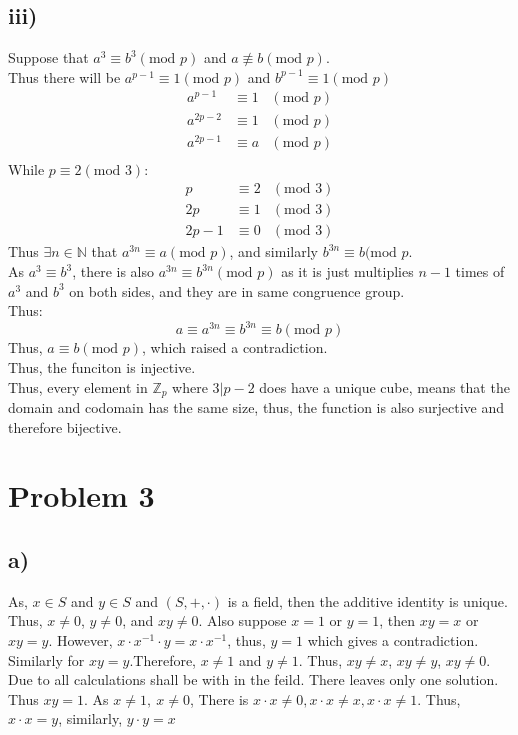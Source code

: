 \documentclass{article}
\begin{document}
\subsection*{iii)}
Suppose that \(a^3\equiv b^3 (\text{mod }p)\) and \(a\not\equiv b (\text{mod }p)\).\\
Thus there will be \(a^{p-1}\equiv 1 (\text{mod }p )\) and \(b^{p-1}\equiv 1(\text{mod }p)\)
\begin{align*}
    a^{p-1}&\equiv 1 &(\text{mod }p)\\
    a^{2p-2}&\equiv 1 &(\text{mod }p)\\
    a^{2p-1}&\equiv a &(\text{mod }p)\\
\end{align*}
While \(p\equiv 2 (\text{mod }3)\):
\begin{align*}
    p&\equiv 2 &(\text{mod }3)\\
    2p&\equiv 1 &(\text{mod }3)\\
    2p-1&\equiv 0 &(\text{mod }3)
\end{align*}
Thus \(\exists n\in \mathbb{N}\) that \(a^{3n} \equiv a (\text{mod }p)\), and similarly \(b^{3n} \equiv b (\text{mod }p\).\\
As \(a^3\equiv b^3\), there is also \(a^{3n}\equiv b^{3n} (\text{mod }p)\) as it is just multiplies \(n-1\) times of \(a^3\) and \(b^3\) on both sides, and they are in same congruence group.
\\ Thus:
\[a \equiv a^{3n} \equiv b^{3n} \equiv b (\text{mod }p)\]
Thus, \(a\equiv b (\text{mod }p)\), which raised a contradiction. \\
Thus, the funciton is injective.\\
Thus, every element in \(\mathbb{Z}_p\) where \(3|p-2\) does have a unique cube, means that the domain and codomain has the same size, thus, the function is also surjective and therefore bijective. 
\newpage
\section*{Problem 3}
\subsection*{a)}
As, \(x\in S\) and \(y \in S\) and \((S,+,\cdot)\) is a field, then the additive identity is unique.
Thus, \(x\neq 0\), \(y\neq 0\), and \(xy\neq 0\). Also suppose \(x=1\) or \(y=1\), then \(xy=x\) or \(xy=y\).
However, \(x\cdot x^{-1}\cdot y = x\cdot x^{-1}\), thus, \(y=1\) which gives a contradiction. Similarly for \(xy=y\).Therefore, \(x\neq1\) and \(y\neq 1\).
Thus, \(xy\neq x\), \(xy\neq y\), \(xy\neq 0\). Due to all calculations shall be with in the feild. There leaves only one solution. Thus
\(xy = 1\). As \(x\neq1,\ x\neq 0\), There is \(x\cdot x \neq 0, x\cdot x \neq x, x\cdot x \neq 1\). Thus, \(x\cdot x = y\), similarly, \(y\cdot y = x\)
\end{document}
